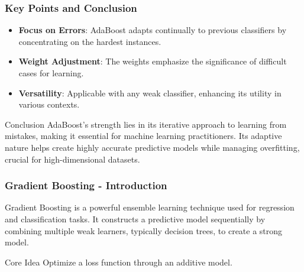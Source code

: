 \documentclass[aspectratio=169]{beamer}
\begin{document}
\begin{frame}[fragile]
  \frametitle{Key Points and Conclusion}
  \begin{itemize}
    \item \textbf{Focus on Errors}: AdaBoost adapts continually to previous classifiers by concentrating on the hardest instances.
    \item \textbf{Weight Adjustment}: The weights emphasize the significance of difficult cases for learning.
    \item \textbf{Versatility}: Applicable with any weak classifier, enhancing its utility in various contexts.
  \end{itemize}

  \begin{block}{Conclusion}
    AdaBoost's strength lies in its iterative approach to learning from mistakes, making it essential for machine learning practitioners. Its adaptive nature helps create highly accurate predictive models while managing overfitting, crucial for high-dimensional datasets.
  \end{block}
\end{frame}

\begin{frame}[fragile]
    \frametitle{Gradient Boosting - Introduction}
    Gradient Boosting is a powerful ensemble learning technique used for regression and classification tasks. 
    It constructs a predictive model sequentially by combining multiple weak learners, typically decision trees, to create a strong model.
    \begin{block}{Core Idea}
        Optimize a loss function through an additive model.
    \end{block}
\end{frame}
\end{document}
